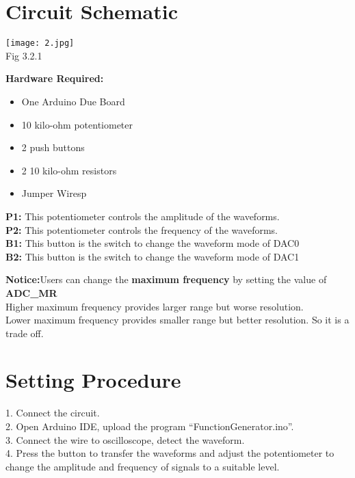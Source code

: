 \documentclass[12pt]{report}
\begin{document}
\section{\large Circuit Schematic}
\begin{center}
\texttt{[image: 2.jpg]}\\
\textup{\footnotesize Fig 3.2.1\\}
\end{center}
\textbf{Hardware Required:}
    \begin{itemize}
        \item One Arduino Due Board
        \item 10 kilo-ohm potentiometer
        \item 2 push buttons
        \item 2 10 kilo-ohm resistors
        \item Jumper Wiresp
    \end{itemize}
\textbf{P1:} This potentiometer controls the amplitude of the waveforms.\\
\textbf{P2:} This potentiometer controls the frequency of the waveforms.\\
\textbf{B1:} This button is the switch to change the waveform mode of DAC0\\
\textbf{B2:} This button is the switch to change the waveform mode of DAC1\\
\begin{flushleft}
\textbf{Notice:}Users can change the \textbf{maximum frequency} by setting the value of \textbf{ADC\_MR}\\Higher maximum frequency provides larger range but worse resolution. \\
Lower  maximum frequency provides smaller range but better resolution. So it is a trade off.
\end{flushleft}
\section{\large Setting Procedure}
\textup{1. Connect the circuit.\\
2. Open Arduino IDE, upload the program ``FunctionGenerator.ino''.\\
3. Connect the wire to oscilloscope, detect the waveform.\\
4. Press the button to transfer the waveforms and adjust the potentiometer to change the amplitude and frequency of signals to a suitable level.\\}
\vspace{5pt}
\end{document}
